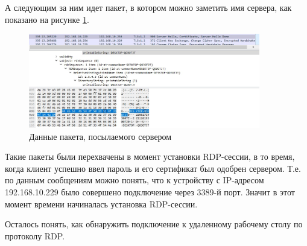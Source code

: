 \documentclass[bachelor, och, coursework]{SCWorks}
\begin{document}
  А следующим за ним идет пакет, в котором можно заметить имя сервера, как показано на рисунке \ref{serv-hello}.

  \begin{figure}[H]
    \centering
    \includegraphics[width=0.9\textwidth]{photo/serv-hello.jpg}
    \caption{Данные пакета, посылаемого сервером}
    \label{serv-hello}
  \end{figure}

  Такие пакеты были перехвачены в момент установки RDP-сессии, в то время, когда клиент успешно ввел пароль и его сертификат
  был одобрен сервером. Т.е. по данным сообщениям можно понять, что к устройству с IP-адресом 192.168.10.229 было совершено
  подключение через 3389-й порт. Значит в этот момент времени начиналась установка RDP-сессии.
  
  Осталось понять, как обнаружить подключение к удаленному рабочему столу по протоколу RDP.


  
\end{document}
